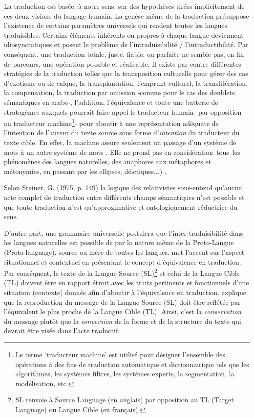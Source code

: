 \documentclass[french]{textolivre}
\begin{document}
La traduction est basée, à notre sens, sur des hypothèses tirées implicitement de ces deux visions du langage humain. La genèse même de la traduction présuppose l'existence de certains paramètres universels qui rendent toutes les langues traduisibles. Certains éléments inhérents ou propres à chaque langue deviennent idiosyncratiques et posent le problème de l’intraduisibilité / l’intraductibilité. Par conséquent, une traduction totale, juste, fiable, ou parfaite ne semble pas, en fin de parcours, une opération possible et réalisable. Il existe par contre différentes stratégies de la traduction telles que la transposition culturelle pour gérer des cas d’exotisme ou de calque, la transplantation, l’emprunt culturel, la translitération, la compensation, la traduction par omission -comme pour le cas des doublets sémantiques en arabe-, l’addition, l’équivalence et toute une batterie de stratagèmes auxquels pourrait faire appel le traducteur humain -par opposition au traducteur machine\footnote{Le terme ‘traducteur machine’ est utilisé pour désigner l’ensemble des opérations à des fins de traduction automatique et dictionnairique tels que les algorithmes, les systèmes filtres, les systèmes experts, la segmentation, la modélisation, etc.}- pour aboutir à une représentation adéquate de l’intention de l’auteur du texte source sous forme d’\emph{intention} du traducteur du texte cible. En effet, la machine assure seulement un passage d’un système de mots à un autre système de mots \cite[p. 213]{aubin1995}. Elle ne prend pas en considération tous les phénomènes des langues naturelles, des anaphores aux métaphores et métonymies, en passant par les ellipses, déictiques...) \cite[p. 215]{sabah2004}.

Selon Steiner, G. (1975, p. 149) la logique des relativistes sous-entend qu’aucun acte complet de traduction entre différents champs sémantiques n’est possible et que toute traduction n’est qu’approximative et ontologiquement réductrice du sens.

D’autre part, une grammaire universelle postulera que l’inter-traduisibilité dans les langues naturelles est possible de par la nature même de la Proto-Langue (Proto-language), source ou mère de toutes les langues. \textcite{catford_linguistic_1965} met l’accent sur l'aspect situationnel et contextuel en présentant le concept d’équivalence en traduction. Par conséquent, le texte de la Langue Source (SL)\footnote{SL renvoie à Source Language (en anglais) par opposition au TL (Target Language) ou Langue Cible (en français).} et celui de la Langue Cible (TL) doivent être en rapport étroit avec les traits pertinents et fonctionnels d’une situation (contexte) donnée afin d’aboutir à l’équivalence en traduction. \textcite{nida1964} explique que la reproduction du message de la Langue Source (SL) doit être reflétée par l’équivalent le plus proche de la Langue Cible (TL). Ainsi, c’est la \emph{conservation} du message plutôt que la \emph{conversion} de la forme et de la structure du texte qui devrait être visée dans l’acte traductif.
\end{document}
